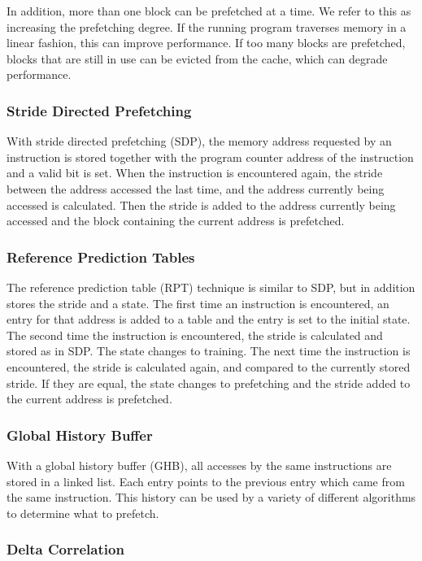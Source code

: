 In addition, more than one block can be prefetched at a time.
We refer to this as increasing the prefetching degree. If the
running program traverses memory in a linear fashion, this can
improve performance. If too many blocks are prefetched, blocks that
are still in use can be evicted from the cache, which can degrade performance.

\subsubsection{Stride Directed Prefetching}

With stride directed prefetching (SDP), the memory address requested by an instruction
is stored together with the program counter address of the instruction
and a valid bit is set. When the instruction is encountered again, the stride
between the address accessed the last time, and the address currently being accessed
is calculated. Then the stride is added to the address currently
being accessed and the block containing the current address is prefetched.

\subsubsection{Reference Prediction Tables}

The reference prediction table (RPT) technique is similar to SDP, but in
addition stores the stride and a state. The first time an
instruction is encountered, an entry for that address is added to a table
and the entry is set to the initial state. The second time the
instruction is encountered, the stride is calculated and stored as in SDP.
The state changes to training. The next time the instruction is
encountered, the stride is calculated again, and compared to the
currently stored stride. If they are equal, the state changes to
prefetching and the stride added to the current address is
prefetched.

\subsubsection{Global History Buffer}

With a global history buffer (GHB), all accesses by the same
instructions are stored in a linked list. Each entry points to
the previous entry which came from the same instruction. This
history can be used by a variety of different algorithms to
determine what to prefetch.

\subsubsection{Delta Correlation}

